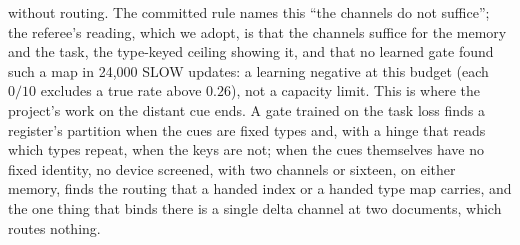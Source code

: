 \documentclass[11pt]{article}
\begin{document}
without routing. The committed rule names this ``the channels do not suffice''; the referee's reading, which we adopt, is that the channels suffice for the memory and the task, the type-keyed ceiling showing it, and that no learned gate found such a map in 24{,}000 SLOW updates: a learning negative at this budget (each $0/10$ excludes a true rate above $0.26$), not a capacity limit. This is where the project's work on the distant cue ends. A gate trained on the task loss finds a register's partition when the cues are fixed types and, with a hinge that reads which types repeat, when the keys are not; when the cues themselves have no fixed identity, no device screened, with two channels or sixteen, on either memory, finds the routing that a handed index or a handed type map carries, and the one thing that binds there is a single delta channel at two documents, which routes nothing.
\end{document}
